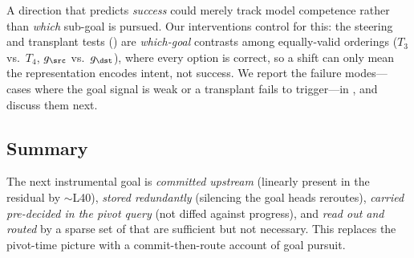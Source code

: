 A direction that predicts \emph{success} could merely track model competence rather than \emph{which}
sub-goal is pursued. Our interventions control for this: the steering and transplant tests
() are \emph{which-goal} contrasts among equally-valid orderings
($T_3$ vs.\ $T_4$, $g_\src$ vs.\ $g_\dst$), where every option is correct, so a shift can only mean the
representation encodes intent, not success. We report the failure modes---cases where the goal signal is
weak or a transplant fails to trigger---in , and discuss them next.

\subsection{Summary}
\label{sec:mechanism:summary}

The next instrumental goal is \emph{committed upstream} (linearly present in the residual by $\sim$L40),
\emph{stored redundantly} (silencing the goal heads reroutes), \emph{carried pre-decided in the pivot
query} (not diffed against progress), and \emph{read out and routed} by a sparse set of \goalheads that
are sufficient but not necessary. This replaces the pivot-time \diffmodel picture with a
commit-then-route account of goal pursuit.
